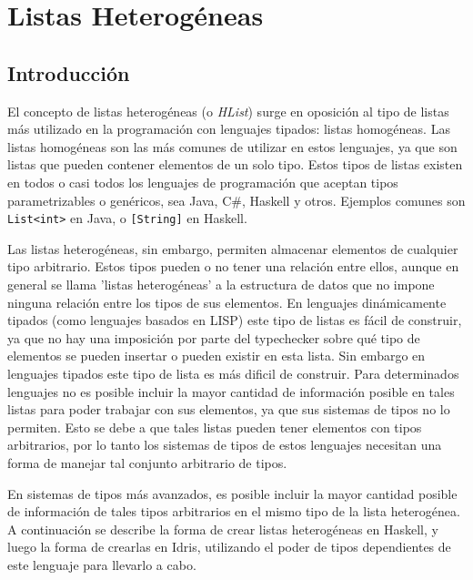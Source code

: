 
\chapter{Listas Heterogéneas}
\label{ch:1}

\section{Introducción}

El concepto de listas heterogéneas (o \textit{HList}) surge en oposición al tipo de listas más utilizado en la programación con lenguajes tipados: listas homogéneas. Las listas homogéneas son las más comunes de utilizar en estos lenguajes, ya que son listas que pueden contener elementos de un solo tipo.
Estos tipos de listas existen en todos o casi todos los lenguajes de programación que aceptan tipos parametrizables o genéricos, sea Java, C\#, Haskell y otros. Ejemplos comunes son \texttt{List<int>} en Java, o \texttt{[String]} en Haskell.

Las listas heterogéneas, sin embargo, permiten almacenar elementos de cualquier tipo arbitrario. Estos tipos pueden o no tener una relación entre ellos, aunque en general se llama 'listas heterogéneas' a la estructura de datos que no impone ninguna relación entre los tipos de sus elementos.
En lenguajes dinámicamente tipados (como lenguajes basados en LISP) este tipo de listas es fácil de construir, ya que no hay una imposición por parte del typechecker sobre qué tipo de elementos se pueden insertar o pueden existir en esta lista. Sin embargo en lenguajes tipados este tipo de lista es más dificil de construir. Para determinados lenguajes no es posible incluir la mayor cantidad de información posible en tales listas para poder trabajar con sus elementos, ya que sus sistemas de tipos no lo permiten. Esto se debe a que tales listas pueden tener elementos con tipos arbitrarios, por lo tanto los sistemas de tipos de estos lenguajes necesitan una forma de manejar tal conjunto arbitrario de tipos.

En sistemas de tipos más avanzados, es posible incluir la mayor cantidad posible de información de tales tipos arbitrarios en el mismo tipo de la lista heterogénea. 
A continuación se describe la forma de crear listas heterogéneas en Haskell, y luego la forma de crearlas en Idris, utilizando el poder de tipos dependientes de este lenguaje para llevarlo a cabo.

